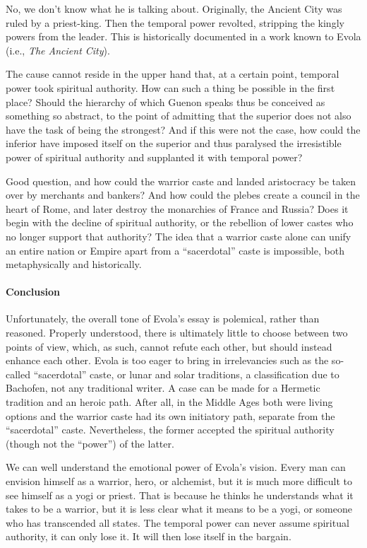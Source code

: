No, we don't know what he is talking about. Originally, the Ancient City was ruled by a priest-king. Then the temporal power revolted, stripping the kingly powers from the leader. This is historically documented in a work known to Evola (i.e., \emph{The Ancient City}).

\begin{quotex}
The cause cannot reside in the upper hand that, at a certain point, temporal power took spiritual authority. How can such a thing be possible in the first place? Should the hierarchy of which Guenon speaks thus be conceived as something so abstract, to the point of admitting that the superior does not also have the task of being the strongest? And if this were not the case, how could the inferior have imposed itself on the superior and thus paralysed the irresistible power of spiritual authority and supplanted it with temporal power?
\end{quotex}


Good question, and how could the warrior caste and landed aristocracy be taken over by merchants and bankers? And how could the plebes create a council in the heart of Rome, and later destroy the monarchies of France and Russia? Does it begin with the decline of spiritual authority, or the rebellion of lower castes who no longer support that authority? The idea that a warrior caste alone can unify an entire nation or Empire apart from a ``sacerdotal'' caste is impossible, both metaphysically and historically.

\paragraph{Conclusion}


Unfortunately, the overall tone of Evola's essay is polemical, rather than reasoned. Properly understood, there is ultimately little to choose between two points of view, which, as such, cannot refute each other, but should instead enhance each other. Evola is too eager to bring in irrelevancies such as the so-called ``sacerdotal'' caste, or lunar and solar traditions, a classification due to Bachofen, not any traditional writer. A case can be made for a Hermetic tradition and an heroic path. After all, in the Middle Ages both were living options and the warrior caste had its own initiatory path, separate from the ``sacerdotal'' caste. Nevertheless, the former accepted the spiritual authority (though not the ``power'') of the latter.

We can well understand the emotional power of Evola's vision. Every man can envision himself as a warrior, hero, or alchemist, but it is much more difficult to see himself as a yogi or priest. That is because he thinks he understands what it takes to be a warrior, but it is less clear what it means to be a yogi, or someone who has transcended all states. The temporal power can never assume spiritual authority, it can only lose it. It will then lose itself in the bargain.


